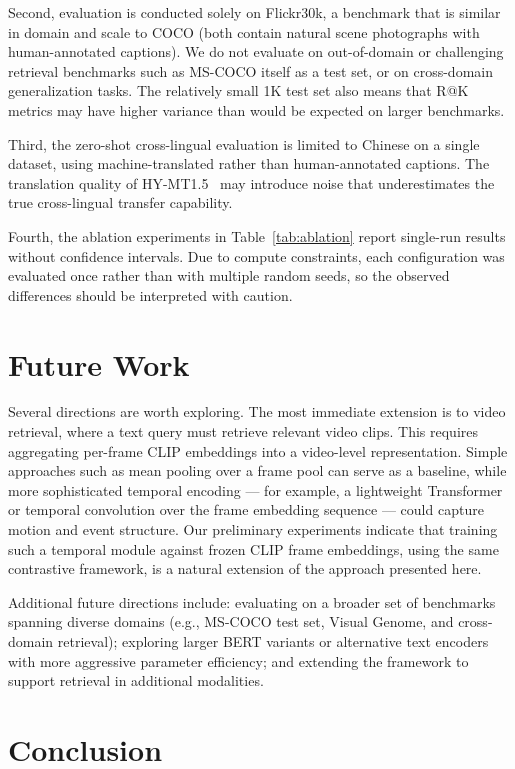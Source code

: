 \documentclass[10pt,leqno]{amsart}
\begin{document}
Second, evaluation is conducted solely on Flickr30k, a benchmark that is similar in domain and scale to COCO (both contain natural scene photographs with human-annotated captions). We do not evaluate on out-of-domain or challenging retrieval benchmarks such as MS-COCO itself as a test set, or on cross-domain generalization tasks. The relatively small 1K test set also means that R@K metrics may have higher variance than would be expected on larger benchmarks.

Third, the zero-shot cross-lingual evaluation is limited to Chinese on a single dataset, using machine-translated rather than human-annotated captions. The translation quality of HY-MT1.5~\citep{hymt152025tencent} may introduce noise that underestimates the true cross-lingual transfer capability.

Fourth, the ablation experiments in Table~\ref{tab:ablation} report single-run results without confidence intervals. Due to compute constraints, each configuration was evaluated once rather than with multiple random seeds, so the observed differences should be interpreted with caution.

\section{Future Work}

Several directions are worth exploring. The most immediate extension is to video retrieval, where a text query must retrieve relevant video clips. This requires aggregating per-frame CLIP embeddings into a video-level representation. Simple approaches such as mean pooling over a frame pool can serve as a baseline, while more sophisticated temporal encoding --- for example, a lightweight Transformer or temporal convolution over the frame embedding sequence --- could capture motion and event structure. Our preliminary experiments indicate that training such a temporal module against frozen CLIP frame embeddings, using the same contrastive framework, is a natural extension of the approach presented here.

Additional future directions include: evaluating on a broader set of benchmarks spanning diverse domains (e.g., MS-COCO test set, Visual Genome, and cross-domain retrieval); exploring larger BERT variants or alternative text encoders with more aggressive parameter efficiency; and extending the framework to support retrieval in additional modalities.

\section{Conclusion}
\end{document}
